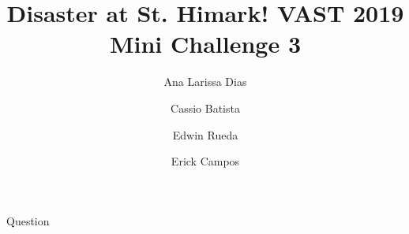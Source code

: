 \documentclass{article}
\author{Ana Larissa Dias \and Cassio Batista \and Edwin Rueda \and Erick Campos}
\title{Disaster at St. Himark! VAST 2019 Mini Challenge 3}
\begin{document}
\maketitle



\begin{section}{Question}
\end{section}
\end{document}
